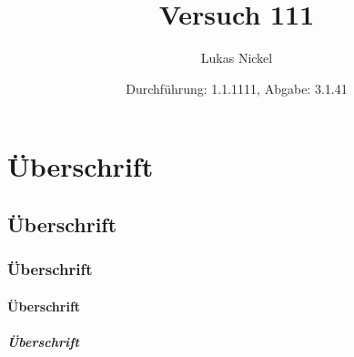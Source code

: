 \documentclass[titlepage=firstiscover]{scrartcl}
\begin{document}
  \title{Versuch 111}
  \author{Lukas Nickel}
  \date{Durchführung: 1.1.1111, Abgabe: 3.1.41}
  \maketitle

  \tableofcontents

  \section{Überschrift}
  \subsection{Überschrift}
  \subsubsection{Überschrift}
  \paragraph{Überschrift} %
  \subparagraph{Überschrift} %


\end{document}
